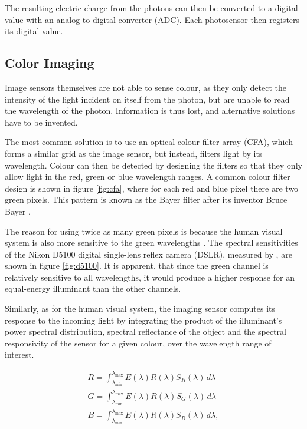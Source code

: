 The resulting electric charge from the photons can then be converted to a digital value with an analog-to-digital converter (ADC). Each photosensor then registers its digital value.


\subsection{Color Imaging}
\label{ss:color}

Image sensors themselves are not able to sense colour, as they only detect the intensity of the light incident on itself from the photon, but are unable to read the wavelength of the photon. Information is thus lost, and alternative solutions have to be invented.

The most common solution is to use an optical colour filter array (CFA), which forms a similar grid as the image sensor, but instead, filters light by its wavelength. Colour can then be detected by designing the filters so that they only allow light in the red, green or blue wavelength ranges. A common colour filter design is shown in figure \ref{fig:cfa}, where for each red and blue pixel there are two green pixels. This pattern is known as the Bayer filter after its inventor Bruce Bayer \cite{Bayer1976}.

The reason for using twice as many green pixels is because the human visual system is also more sensitive to the green wavelengths \cite[36]{Ramanath}. The spectral sensitivities of the Nikon D5100 digital single-lens reflex camera (DSLR), measured by \citeauthor{D5100NPL}, are shown in figure \ref{fig:d5100}. It is apparent, that since the green channel is relatively sensitive to all wavelengths, it would produce a higher response for an equal-energy illuminant than the other channels.

Similarly, as for the human visual system, the imaging sensor computes its response to the incoming light by integrating the product of the illuminant's power spectral distribution, spectral reflectance of the object and the spectral responsivity of the sensor for a given colour, over the wavelength range of interest.

\begin{align}
R = \int_{\lambda_{\text{min}}}^{\lambda_{\text{max}}} E(\lambda) R(\lambda) S_R(\lambda) \, d\lambda \\
G = \int_{\lambda_{\text{min}}}^{\lambda_{\text{max}}} E(\lambda) R(\lambda) S_G(\lambda) \, d\lambda \\
B = \int_{\lambda_{\text{min}}}^{\lambda_{\text{max}}} E(\lambda) R(\lambda) S_B(\lambda) \, d\lambda,
\end{align}

